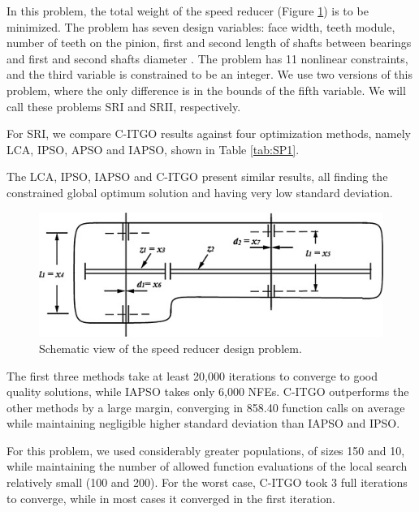 In this problem, the total weight of the speed reducer (Figure \ref{fig:SR}) is to be minimized. The problem has seven design variables: face width, teeth module, number of teeth on the pinion, first and second length of shafts between bearings and first and second shafts diameter \citep{SR}. The problem has 11 nonlinear constraints, and the third variable is constrained to be an integer. We use two versions of this problem, where the only difference is in the bounds of the fifth variable. We will call these problems SRI and SRII, respectively.


For SRI, we compare C-ITGO results against four optimization methods, namely LCA, IPSO, APSO and IAPSO, shown in Table \ref{tab:SP1}.

The LCA, IPSO, IAPSO and C-ITGO present similar results, all finding the constrained global optimum solution and having very low standard deviation.

\begin{figure}[h]
    \begin{center}
    \includegraphics[scale=0.6]{Imgs/SR.jpg}
    \end{center}
    \captionsetup{justification=centering}
    \caption{Schematic view of the speed reducer design problem.}\label{fig:SR}
\end{figure}




The first three methods take at least 20,000 iterations to converge to good quality solutions, while IAPSO takes only 6,000 NFEs. C-ITGO outperforms the other methods by a large margin, converging in 858.40 function calls on average while maintaining negligible higher standard deviation than IAPSO and IPSO.

For this problem, we used considerably greater populations, of sizes 150 and 10, while maintaining the number of allowed function evaluations of the local search relatively small (100 and 200). For the worst case, C-ITGO took 3 full iterations to converge, while in most cases it converged in the first iteration.

